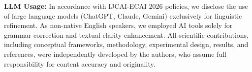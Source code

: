 \documentclass{article}
\begin{document}
\textbf{LLM Usage:} In accordance with IJCAI-ECAI 2026 policies, we disclose the use of large language models (ChatGPT, Claude, Gemini) exclusively for linguistic refinement. As non-native English speakers, we employed AI tools solely for grammar correction and textual clarity enhancement. All scientific contributions, including conceptual frameworks, methodology, experimental design, results, and references, were independently developed by the authors, who assume full responsibility for content accuracy and originality.



\end{document}
